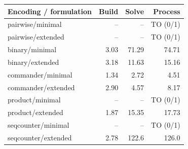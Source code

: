 \begin{tabular}{lrrr}
\toprule
Encoding / formulation & Build & Solve & Process \\
\midrule
pairwise/minimal & -- & -- & TO (0/1) \\
pairwise/extended & -- & -- & TO (0/1) \\
binary/minimal & 3.03 & 71.29 & 74.71 \\
binary/extended & 3.18 & 11.63 & 15.16 \\
commander/minimal & 1.34 & 2.72 & 4.51 \\
commander/extended & 2.90 & 4.57 & 8.17 \\
product/minimal & -- & -- & TO (0/1) \\
product/extended & 1.87 & 15.35 & 17.73 \\
seqcounter/minimal & -- & -- & TO (0/1) \\
seqcounter/extended & 2.78 & 122.6 & 126.0 \\
\bottomrule
\end{tabular}
